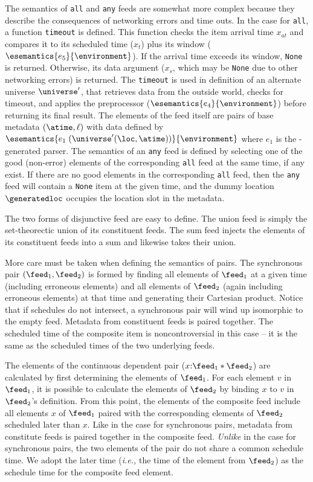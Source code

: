 The semantics of {\tt all} and {\tt any} feeds are somewhat more complex
because they describe the consequences of networking errors and time outs.
In the case for {\tt all}, a function {\tt timeout} is defined.  This
function checks the item arrival time $x_{at}$ and compares it to its
scheduled time ($x_t$) plus its window ($\esemantics{e_5}{\environment}$).  If
the arrival time exceeds its window, {\tt None} is returned. Otherwise,
its data argument ($x_s$, which may be {\tt None} due to other networking 
errors) is returned.  The {\tt timeout} is used in definition of an 
alternate universe $\universe'$, that retrieves data from the outside world,
checks for timeout, and applies the preprocessor 
($\esemantics{e_4}{\environment}$) before returning its final result.
The elements of the feed itself are pairs of base metadata $(\atime,\ell)$
with data defined by $\esemantics{e_1 \; (\universe'(\loc,\atime))}{\environment}$
where $e_1$ is the \pads{}-generated parser.
The semantics of an {\tt any} feed is defined by selecting one of the
good (non-error) elements of the corresponding {\tt all} feed at the same time,
if any exist.  If there are no good elements in 
 the corresponding {\tt all} feed, then the {\tt any} feed will contain a
{\tt None} item at the given time, and the dummy location $\generatedloc$
occupies the location slot in the metadata.

The two forms of disjunctive feed are easy to define.  The
union feed is simply the set-theorectic union of
its constituent feeds.  The sum feed injects the elements of its constituent
feeds into a sum and likewise takes their union.

More care must be taken when defining the semantics of pairs.
The synchronous pair $(\feed_1,\feed_2)$
is formed by finding all elements of $\feed_1$
at a given time (including erroneous elements) 
and all elements of  $\feed_2$ (again including erroneous elements) 
at that time and
generating their Cartesian product.  Notice that if schedules 
do not intersect, a synchronous pair will wind up isomorphic to the
empty feed.  Metadata from constituent feeds is paired together.
The scheduled time of the composite item is noncontroversial in this case --
it is the same as the scheduled times of the two underlying feeds.

The elements of the continuous dependent pair ($x{:}\feed_1 * \feed_2$)
are calculated by first determining the elements of $\feed_1$. 
For each element $v$ in $\feed_1$, it is possible to calculate
the elements of $\feed_2$ by binding $x$ to $v$ in $\feed_2$'s definition.
From this point, the elements of the composite feed include all elements
$x$ of $\feed_1$ paired with the corresponding elements of $\feed_2$ scheduled
later than $x$.  Like in the case for synchronous pairs, metadata from 
constitute feeds is paired together in the composite feed.  {\em Unlike}
in the case for synchronous pairs, the two elements of the pair do
not share a common schedule time.  We adopt the later time ({\em i.e.,}
the time of the element from $\feed_2$) as the schedule time for the
composite feed element.

